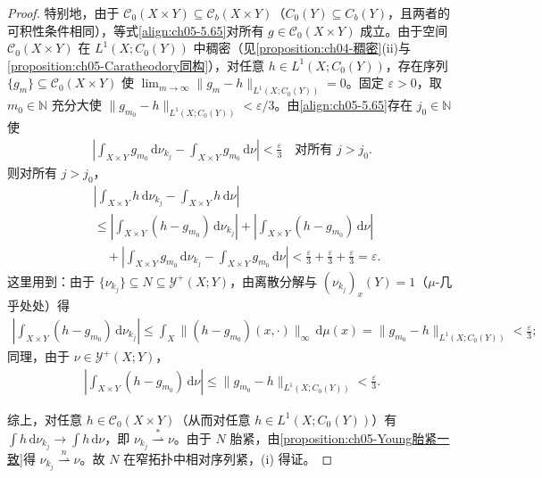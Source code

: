 \documentclass[../../main.tex]{subfiles}%
\begin{document}
\begin{proof}
特别地，由于 $\mathcal{C}_0(X\times Y)\subseteq\mathcal{C}_b(X\times Y)$（$C_0(Y)\subseteq C_b(Y)$，且两者的可积性条件相同），等式\eqref{align:ch05-5.65}对所有 $g\in\mathcal{C}_0(X\times Y)$ 成立。由于空间 $\mathcal{C}_0(X\times Y)$ 在 $L^1(X;C_0(Y))$ 中稠密（见\cref{proposition:ch04-稠密}(ii)与\cref{proposition:ch05-Caratheodory同构}），对任意 $h\in L^1(X;C_0(Y))$，存在序列 $\{g_m\}\subseteq\mathcal{C}_0(X\times Y)$ 使 $\lim_{m\to\infty}\|g_m-h\|_{L^1(X;C_0(Y))}=0$。固定 $\varepsilon>0$，取 $m_0\in\mathbb{N}$ 充分大使 $\|g_{m_0}-h\|_{L^1(X;C_0(Y))}<\varepsilon/3$。由\eqref{align:ch05-5.65}存在 $j_0\in\mathbb{N}$ 使
\begin{align*}
\left|\int_{X\times Y}g_{m_0}\,\mathrm{d}\nu_{k_j}-\int_{X\times Y}g_{m_0}\,\mathrm{d}\nu\right|<\frac{\varepsilon}{3}
\quad\text{对所有 }j>j_0.
\end{align*}
则对所有 $j>j_0$，
\begin{align*}
&\left|\int_{X\times Y}h\,\mathrm{d}\nu_{k_j}-\int_{X\times Y}h\,\mathrm{d}\nu\right|\\
&\leqslant\left|\int_{X\times Y}(h-g_{m_0})\,\mathrm{d}\nu_{k_j}\right|
+\left|\int_{X\times Y}(h-g_{m_0})\,\mathrm{d}\nu\right|\\
&\quad+\left|\int_{X\times Y}g_{m_0}\,\mathrm{d}\nu_{k_j}-\int_{X\times Y}g_{m_0}\,\mathrm{d}\nu\right|
<\frac{\varepsilon}{3}+\frac{\varepsilon}{3}+\frac{\varepsilon}{3}=\varepsilon.
\end{align*}
这里用到：由于 $\{\nu_{k_j}\}\subseteq N\subseteq\mathcal{Y}^+(X;Y)$，由离散分解与 $(\nu_{k_j})_x(Y)=1$（$\mu$-几乎处处）得
\begin{align*}
\left|\int_{X\times Y}(h-g_{m_0})\,\mathrm{d}\nu_{k_j}\right|
\leqslant\int_X\|(h-g_{m_0})(x,\cdot)\|_\infty\,\mathrm{d}\mu(x)
=\|g_{m_0}-h\|_{L^1(X;C_0(Y))}<\frac{\varepsilon}{3};
\end{align*}
同理，由于 $\nu\in\mathcal{Y}^+(X;Y)$，
\begin{align*}
\left|\int_{X\times Y}(h-g_{m_0})\,\mathrm{d}\nu\right|
\leqslant\|g_{m_0}-h\|_{L^1(X;C_0(Y))}<\frac{\varepsilon}{3}.
\end{align*}

综上，对任意 $h\in\mathcal{C}_0(X\times Y)$（从而对任意 $h\in L^1(X;C_0(Y))$）有 $\int h\,\mathrm{d}\nu_{k_j}\to\int h\,\mathrm{d}\nu$，即 $\nu_{k_j}\stackrel{*}{\rightharpoonup}\nu$。由于 $N$ 胎紧，由\cref{proposition:ch05-Young胎紧一致}得 $\nu_{k_j}\stackrel{n}{\rightharpoonup}\nu$。故 $N$ 在窄拓扑中相对序列紧，(i) 得证。
\end{proof}
\end{document}
